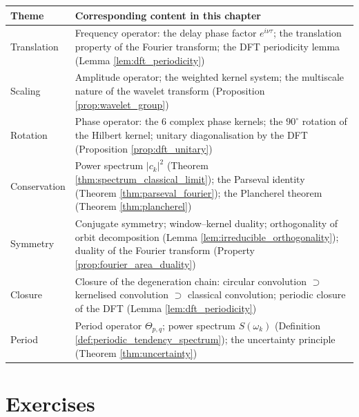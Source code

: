 \begin{center}
\renewcommand{\arraystretch}{1.3}
\begin{tabularx}{\linewidth}{@{}>{\raggedright\arraybackslash\hspace{0pt}}p{2.8cm} >{\raggedright\arraybackslash\hspace{0pt}}X@{}}
\toprule
Theme & Corresponding content in this chapter \\
\midrule
Translation & Frequency operator: the delay phase factor $e^{i\nu\tau}$; the translation property of the Fourier transform; the DFT periodicity lemma (Lemma \ref{lem:dft_periodicity}) \\
Scaling & Amplitude operator; the weighted kernel system; the multiscale nature of the wavelet transform (Proposition \ref{prop:wavelet_group}) \\
Rotation & Phase operator: the 6 complex phase kernels; the $90^\circ$ rotation of the Hilbert kernel; unitary diagonalisation by the DFT (Proposition \ref{prop:dft_unitary}) \\
Conservation & Power spectrum $|c_k|^2$ (Theorem \ref{thm:spectrum_classical_limit}); the Parseval identity (Theorem \ref{thm:parseval_fourier}); the Plancherel theorem (Theorem \ref{thm:plancherel}) \\
Symmetry & Conjugate symmetry; window--kernel duality; orthogonality of orbit decomposition (Lemma \ref{lem:irreducible_orthogonality}); duality of the Fourier transform (Property \ref{prop:fourier_area_duality}) \\
Closure & Closure of the degeneration chain: circular convolution $\supset$ kernelised convolution $\supset$ classical convolution; periodic closure of the DFT (Lemma \ref{lem:dft_periodicity}) \\
Period & Period operator $\Theta_{p,q}$; power spectrum $S(\omega_k)$ (Definition \ref{def:periodic_tendency_spectrum}); the uncertainty principle (Theorem \ref{thm:uncertainty}) \\
\bottomrule
\end{tabularx}
\end{center}

\section*{Exercises}

